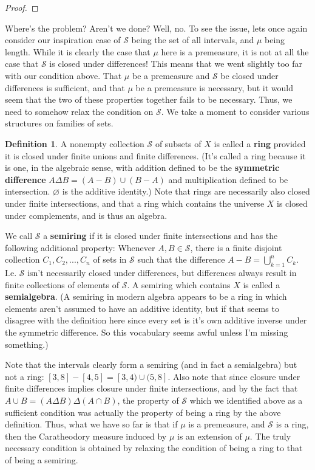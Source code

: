 \documentclass{article}
\theoremstyle{definition}
\newtheorem{definition}{Definition}[section]
\theoremstyle{plain}
\theoremstyle{theorem}
\begin{document}
\begin{proof}
\end{proof}
Where's the problem? Aren't we done? Well, no. To see the issue, lets once again consider our inspiration case of $\mathcal{S}$ being the set of all intervals, and $\mu$ being length. While it is clearly the case that $\mu$ here is a premeasure, it is not at all the case that $\mathcal{S}$ is closed under differences! This means that we went slightly too far with our condition above. That $\mu$ be a premeasure and $\mathcal{S}$ be closed under differences is sufficient, and that $\mu$ be a premeasure is necessary, but it would seem that the two of these properties together fails to be necessary. Thus, we need to somehow relax the condition on $\mathcal{S}$. We take a moment to consider various structures on families of sets.
\begin{definition}
	A nonempty collection $\mathcal{S}$ of subsets of $X$ is called a \textbf{ring} provided it is closed under finite unions and finite differences. (It's called a ring because it is one, in the algebraic sense, with addition defined to be the \textbf{symmetric difference} $A \Delta B = (A-B) \cup (B-A)$ and multiplication defined to be intersection. $\varnothing$ is the additive identity.) Note that rings are necessarily also closed under finite intersections, and that a ring which contains the universe $X$ is closed under complements, and is thus an algebra. \par 
	We call $\mathcal{S}$ a \textbf{semiring} if it is closed under finite intersections and has the following additional property: Whenever $A,B \in \mathcal{S}$, there is a finite disjoint collection $C_1,C_2,...,C_n$ of sets in $\mathcal{S}$ such that the difference $A-B = \bigcup_{k=1}^n C_k$. I.e. $\mathcal{S}$ isn't necessarily closed under differences, but differences always result in finite collections of elements of $\mathcal{S}$. A semiring which contains $X$ is called a \textbf{semialgebra}. (A semiring in modern algebra appears to be a ring in which elements aren't assumed to have an additive identity, but if that seems to disagree with the definition here since every set is it's own additive inverse under the symmetric difference. So this vocabulary seems awful unless I'm missing something.)
\end{definition} 
Note that the intervals clearly form a semiring (and in fact a semialgebra) but not a ring: $[3,8] - [4,5] = [3,4) \cup (5,8]$. Also note that since closure under finite differences implies closure under finite intersections, and by the fact that $A \cup B = (A\Delta B)\Delta (A\cap B)$, the property of $\mathcal{S}$ which we identified above as a sufficient condition was actually the property of being a ring by the above definition. Thus, what we have so far is that if $\mu$ is a premeasure, and $\mathcal{S}$ is a ring, then the Caratheodory measure induced by $\mu$ is an extension of $\mu$. The truly necessary condition is obtained by relaxing the condition of being a ring to that of being a semiring. \par 
\end{document}
